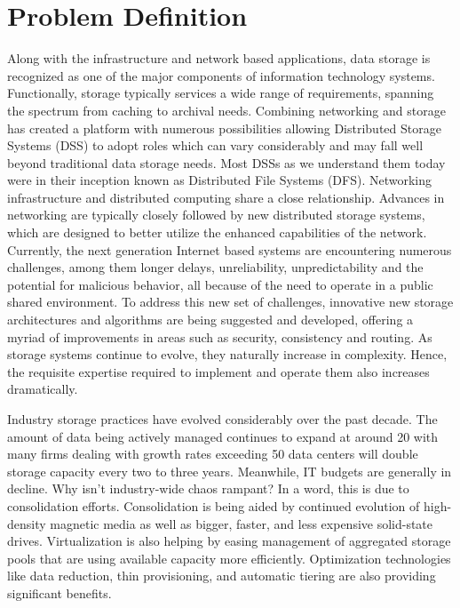 \documentclass[11pt]{article}
\begin{document}
\newpage

\section{Problem Definition}
Along with the infrastructure and network based applications, data 
storage is recognized as one of the major components of information 
technology systems.  Functionally, storage typically services a wide 
range of requirements, spanning the spectrum from caching to archival 
needs. Combining networking and storage has created a platform with 
numerous possibilities allowing Distributed Storage Systems (DSS) to 
adopt roles which can vary considerably and may fall well beyond 
traditional data storage needs. Most DSSs as we understand them today 
were in their inception known as Distributed File Systems (DFS). Networking 
infrastructure and distributed computing share a close relationship. 
Advances in networking are typically closely followed by new distributed 
storage systems, which are designed to better utilize the enhanced 
capabilities of the network. Currently, the next generation Internet based 
systems are encountering numerous challenges, among them longer delays, 
unreliability, unpredictability and the potential for malicious behavior, 
all because of the need to operate in a public shared environment. To address 
this new set of challenges, innovative new storage architectures and 
algorithms are being suggested and developed, offering a myriad of 
improvements in areas such as security, consistency and routing. 
As storage systems continue to evolve, they naturally increase in complexity. 
Hence, the requisite expertise required to implement and operate them also 
increases dramatically. 

Industry storage practices have evolved considerably over the past decade. The 
amount of data being actively managed continues to expand at around 20%
with many firms dealing with growth rates exceeding 50%
data centers will double storage capacity every two to three years. Meanwhile, 
IT budgets are generally in decline. Why isn’t industry-wide chaos rampant? In 
a word, this is due to consolidation efforts. Consolidation is being aided by 
continued evolution of high-density magnetic media as well as bigger, faster, and 
less expensive solid-state drives. Virtualization is also helping by easing 
management of aggregated storage pools that are using available capacity more 
efficiently. Optimization technologies like data reduction, thin provisioning, 
and automatic tiering are also providing significant benefits.
\end{document}
